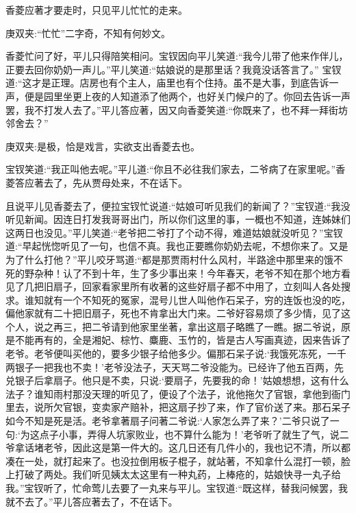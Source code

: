 \begin{parag}
    香菱应著才要走时，只见平儿忙忙的走来。\begin{note}庚双夹:“忙忙”二字奇，不知有何妙文。\end{note}香菱忙问了好，平儿只得陪笑相问。宝钗因向平儿笑道:“我今儿带了他来作伴儿，正要去回你奶奶一声儿。”平儿笑道:“姑娘说的是那里话？我竟没话答言了。” 宝钗道:“这才是正理。店房也有个主人，庙里也有个住持。虽不是大事，到底告诉一声，便是园里坐更上夜的人知道添了他两个，也好关门候户的了。你回去告诉一声罢，我不打发人去了。”平儿答应著，因又向香菱笑道:“你既来了，也不拜一拜街坊邻舍去？”\begin{note}庚双夹:是极，恰是戏言，实欲支出香菱去也。\end{note}宝钗笑道:“我正叫他去呢。”平儿道:“你且不必往我们家去，二爷病了在家里呢。”香菱答应著去了，先从贾母处来，不在话下。
\end{parag}


\begin{parag}
    且说平儿见香菱去了，便拉宝钗忙说道:“姑娘可听见我们的新闻了？”宝钗道:“我没听见新闻。因连日打发我哥哥出门，所以你们这里的事，一概也不知道，连姊妹们这两日也没见。”平儿笑道:“老爷把二爷打了个动不得，难道姑娘就没听见？”宝钗道:“早起恍惚听见了一句，也信不真。我也正要瞧你奶奶去呢，不想你来了。又是为了什么打他？”平儿咬牙骂道:“都是那贾雨村什么风村，半路途中那里来的饿不死的野杂种！认了不到十年，生了多少事出来！今年春天，老爷不知在那个地方看见了几把旧扇子，回家看家里所有收著的这些好扇子都不中用了，立刻叫人各处搜求。谁知就有一个不知死的冤家，混号儿世人叫他作石呆子，穷的连饭也没的吃，偏他家就有二十把旧扇子，死也不肯拿出大门来。二爷好容易烦了多少情，见了这个人，说之再三，把二爷请到他家里坐著，拿出这扇子略瞧了一瞧。据二爷说，原是不能再有的，全是湘妃、棕竹、麋鹿、玉竹的，皆是古人写画真迹，因来告诉了老爷。老爷便叫买他的，要多少银子给他多少。偏那石呆子说:‘我饿死冻死，一千两银子一把我也不卖！’老爷没法子，天天骂二爷没能为。已经许了他五百两，先兑银子后拿扇子。他只是不卖，只说:‘要扇子，先要我的命！’姑娘想想，这有什么法子？谁知雨村那没天理的听见了，便设了个法子，讹他拖欠了官银，拿他到衙门里去，说所欠官银，变卖家产赔补，把这扇子抄了来，作了官价送了来。那石呆子如今不知是死是活。老爷拿著扇子问著二爷说:‘人家怎么弄了来？’二爷只说了一句:‘为这点子小事，弄得人坑家败业，也不算什么能为！’老爷听了就生了气，说二爷拿话堵老爷，因此这是第一件大的。这几日还有几件小的，我也记不清，所以都凑在一处，就打起来了。也没拉倒用板子棍子，就站著，不知拿什么混打一顿，脸上打破了两处。我们听见姨太太这里有一种丸药，上棒疮的，姑娘快寻一丸子给我。”宝钗听了，忙命莺儿去要了一丸来与平儿。宝钗道:“既这样，替我问候罢，我就不去了。”平儿答应著去了，不在话下。
\end{parag}


